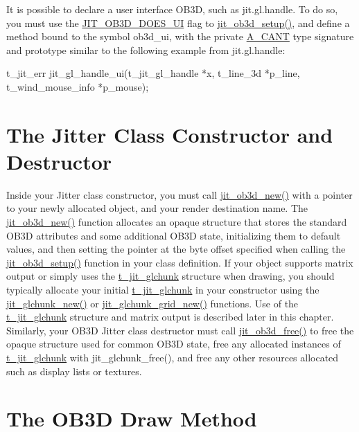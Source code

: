 It is possible to declare a user interface OB3D, such as jit.gl.handle. To do so, you must use the \hyperlink{group__jitter_gaafef09ee7a36fc16e46529783df7cd72}{JIT\_\-OB3D\_\-DOES\_\-UI} flag to \hyperlink{group__ob3dmod_gaee60152a1d507a630e14f0e4f71e86f2}{jit\_\-ob3d\_\-setup()}, and define a method bound to the symbol ob3d\_\-ui, with the private \hyperlink{group__atom_gga8aa6700e9f00b132eb376db6e39ade47af48193ec36e53b1507d81c49873c8d7a}{A\_\-CANT} type signature and prototype similar to the following example from jit.gl.handle:


\begin{DoxyCode}
t_jit_err jit_gl_handle_ui(t_jit_gl_handle *x, 
   t_line_3d *p_line, t_wind_mouse_info *p_mouse);
\end{DoxyCode}
\hypertarget{chapter_jit_ob3ddetails_chapter_jit_ob3ddetails_jitclassctor}{}\section{The Jitter Class Constructor and Destructor}\label{chapter_jit_ob3ddetails_chapter_jit_ob3ddetails_jitclassctor}
Inside your Jitter class constructor, you must call \hyperlink{group__ob3dmod_gac27d63b4d66faf27fda165792dafa223}{jit\_\-ob3d\_\-new()} with a pointer to your newly allocated object, and your render destination name. The \hyperlink{group__ob3dmod_gac27d63b4d66faf27fda165792dafa223}{jit\_\-ob3d\_\-new()} function allocates an opaque structure that stores the standard OB3D attributes and some additional OB3D state, initializing them to default values, and then setting the pointer at the byte offset specified when calling the \hyperlink{group__ob3dmod_gaee60152a1d507a630e14f0e4f71e86f2}{jit\_\-ob3d\_\-setup()} function in your class definition. If your object supports matrix output or simply uses the \hyperlink{structt__jit__glchunk}{t\_\-jit\_\-glchunk} structure when drawing, you should typically allocate your initial \hyperlink{structt__jit__glchunk}{t\_\-jit\_\-glchunk} in your constructor using the \hyperlink{group__ob3dmod_gae1cfab3f91302b90cdcd8e8723295f91}{jit\_\-glchunk\_\-new()} or \hyperlink{group__ob3dmod_ga5c8a73551161b7ba602c0bea2ea9e479}{jit\_\-glchunk\_\-grid\_\-new()} functions. Use of the \hyperlink{structt__jit__glchunk}{t\_\-jit\_\-glchunk} structure and matrix output is described later in this chapter. Similarly, your OB3D Jitter class destructor must call \hyperlink{group__ob3dmod_ga5c1537df19c2d7e12ef809d3de3943d9}{jit\_\-ob3d\_\-free()} to free the opaque structure used for common OB3D state, free any allocated instances of \hyperlink{structt__jit__glchunk}{t\_\-jit\_\-glchunk} with jit\_\-glchunk\_\-free(), and free any other resources allocated such as display lists or textures.\hypertarget{chapter_jit_ob3ddetails_chapter_jit_ob3ddetails_ob3ddraw}{}\section{The OB3D Draw Method}\label{chapter_jit_ob3ddetails_chapter_jit_ob3ddetails_ob3ddraw}
